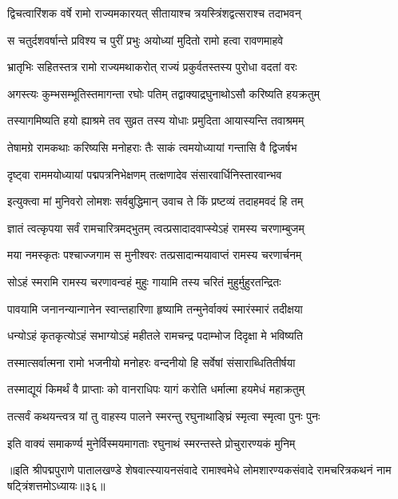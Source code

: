 \twolineshloka
{द्विचत्वारिंशक वर्षे रामो राज्यमकारयत्}
{सीतायाश्च त्रयस्त्रिंशद्वत्सराश्च तदाभवन्}%

\twolineshloka
{स चतुर्दशवर्षान्ते प्रविश्य च पुरीं प्रभुः}
{अयोध्यां मुदितो रामो हत्वा रावणमाहवे}%

\twolineshloka
{भ्रातृभिः सहितस्तत्र रामो राज्यमथाकरोत्}
{राज्यं प्रकुर्वतस्तस्य पुरोधा वदतां वरः}%

\twolineshloka
{अगस्त्यः कुम्भसम्भूतिस्तमागन्ता रघोः पतिम्}
{तद्वाक्याद्रघुनाथोऽसौ करिष्यति हयक्रतुम्}%

\twolineshloka
{तस्यागमिष्यति हयो ह्याश्रमे तव सुव्रत}
{तस्य योधाः प्रमुदिता आयास्यन्ति तवाश्रमम्}%

\twolineshloka
{तेषामग्रे रामकथाः करिष्यसि मनोहराः}
{तैः साकं त्वमयोध्यायां गन्तासि वै द्विजर्षभ}%

\twolineshloka
{दृष्ट्वा राममयोध्यायां पद्मपत्रनिभेक्षणम्}
{तत्क्षणादेव संसारवार्धिनिस्तारवान्भव}%

\twolineshloka
{इत्युक्त्वा मां मुनिवरो लोमशः सर्वबुद्धिमान्}
{उवाच ते किं प्रष्टव्यं तदाहमवदं हि तम्}%

\twolineshloka
{ज्ञातं त्वत्कृपया सर्वं रामचारित्रमद्भुतम्}
{त्वत्प्रसादादवाप्स्येऽहं रामस्य चरणाम्बुजम्}%

\twolineshloka
{मया नमस्कृतः पश्चाज्जगाम स मुनीश्वरः}
{तत्प्रसादान्मयावाप्तं रामस्य चरणार्चनम्}%

\twolineshloka
{सोऽहं स्मरामि रामस्य चरणावन्वहं मुहुः}
{गायामि तस्य चरितं मुहुर्मुहुरतन्द्रितः}%

\twolineshloka
{पावयामि जनानन्यान्गानेन स्वान्तहारिणा}
{हृष्यामि तन्मुनेर्वाक्यं स्मारंस्मारं तदीक्षया}%

\twolineshloka
{धन्योऽहं कृतकृत्योऽहं सभाग्योऽहं महीतले}
{रामचन्द्र पदाम्भोज दिदृक्षा मे भविष्यति}%

\twolineshloka
{तस्मात्सर्वात्मना रामो भजनीयो मनोहरः}
{वन्दनीयो हि सर्वेषां संसाराब्धितितीर्षया}%

\twolineshloka
{तस्माद्यूयं किमर्थं वै प्राप्ताः को वानराधिपः}
{यागं करोति धर्मात्मा हयमेधं महाक्रतुम्}%

\twolineshloka
{तत्सर्वं कथयन्त्वत्र यां तु वाहस्य पालने}
{स्मरन्तु रघुनाथाङ्घ्रिं स्मृत्वा स्मृत्वा पुनः पुनः}%

\twolineshloka
{इति वाक्यं समाकर्ण्य मुनेर्विस्मयमागताः}
{रघुनाथं स्मरन्तस्ते प्रोचुरारण्यकं मुनिम्}%

॥इति श्रीपद्मपुराणे पातालखण्डे शेषवात्स्यायनसंवादे रामाश्वमेधे लोमशारण्यकसंवादे रामचरित्रकथनं नाम षट्त्रिंशत्तमोऽध्यायः॥३६॥

